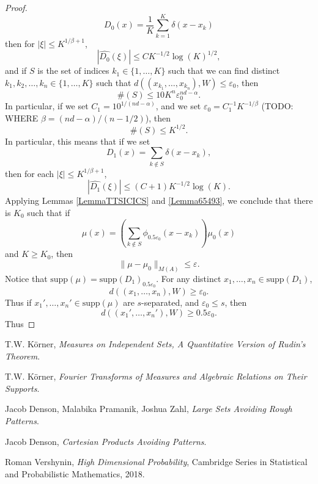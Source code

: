 \documentclass[12pt,reqno]{article}
\numberwithin{equation}{section}
\begin{document}
\begin{proof}
    \[ D_0(x) = \frac{1}{K} \sum_{k = 1}^K \delta(x - x_k) \]
    then for $|\xi| \leq K^{1/\beta + 1}$,
    \begin{equation} \label{equationGGGISCI11242}
        |\widehat{D_0}(\xi)| \leq C K^{-1/2} \log(K)^{1/2},
    \end{equation}
    and if $S$ is the set of indices $k_1 \in \{ 1, \dots, K \}$ such that we can find distinct $k_1, k_2, \dots, k_n \in \{ 1, \dots, K \}$ such that $d((x_{k_1}, \dots, x_{k_n}), W) \leq \varepsilon_0$, then
    \begin{equation} \label{equationGGSC99124}
        \#(S) \leq 10 K^n \varepsilon_0^{nd-\alpha}.
    \end{equation}
    In particular, if we set $C_1 = 10^{1/(nd-\alpha)}$, and we set $\varepsilon_0 = C_1^{-1} K^{-1/\beta}$ (TODO: WHERE $\beta = (nd - \alpha)/(n-1/2)$), then
    \[ \#(S) \leq K^{1/2}. \]
    In particular, this means that if we set
    \[ D_1(x) = \sum_{k \not \in S} \delta(x - x_k), \]
    then for each $|\xi| \leq K^{1/\beta + 1}$,
    \[ |\widehat{D_1}(\xi)| \leq (C+1) K^{-1/2} \log(K). \]
    Applying Lemmas \ref{LemmaTTSICICS} and \ref{Lemma65493}, we conclude that there is $K_0$ such that if
    \[ \mu(x) = \left( \sum_{k \not \in S} \phi_{0.5 \varepsilon_0}(x - x_k) \right) \mu_0(x) \]
    and $K \geq K_0$, then
    \[ \| \mu - \mu_0 \|_{M(A)} \leq \varepsilon. \]
    Notice that $\text{supp}(\mu) = \text{supp}(D_1)_{0.5 \varepsilon_0}$. For any distinct $x_1, \dots, x_n \in \text{supp}(D_1)$,
    \[ d((x_1, \dots, x_n), W) \geq \varepsilon_0. \]
    Thus if $x_1', \dots, x_n' \in \text{supp}(\mu)$ are $s$-separated, and $\varepsilon_0 \leq s$, then
    \[ d((x_1', \dots, x_n'),W) \geq 0.5 \varepsilon_0. \]
    Thus
\end{proof}

\begin{thebibliography}{9}

    T.W. K\"{o}rner,
    \textit{Measures on Independent Sets, A Quantitative Version of Rudin's Theorem}.

    T.W. K\"{o}rner,
    \textit{Fourier Transforms of Measures and Algebraic Relations on Their Supports}.

    Jacob Denson, Malabika Pramanik, Joshua Zahl,
    \textit{Large Sets Avoiding Rough Patterns}.

    Jacob Denson,
    \textit{Cartesian Products Avoiding Patterns}.

    Roman Vershynin,
    \textit{High Dimensional Probability},
    Cambridge Series in Statistical and Probabilistic Mathematics,
    2018.

\end{thebibliography}
\end{document}
